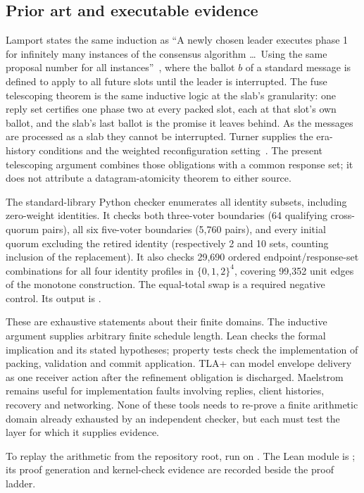 \subsection{Prior art and executable evidence}
Lamport states the same induction as ``A newly chosen leader executes phase 1 for
infinitely many instances of the consensus algorithm \ldots\ Using the same
proposal number for all instances''~\cite{fuse-paxos}, where the ballot $b$ of a
standard message is defined to apply to all future slots until the leader is
interrupted. The fuse telescoping theorem is the same inductive logic at the
slab's granularity: one reply set certifies one phase two at every packed slot,
each at that slot's own ballot, and the slab's last ballot is the promise it
leaves behind. As the messages are processed as a slab they cannot be interrupted.
Turner supplies the era-history conditions and the weighted reconfiguration
setting~\cite{turner}. The present
telescoping argument combines those obligations with a common response set;
it does not attribute a datagram-atomicity theorem to either source.

The standard-library Python checker
 enumerates all identity
subsets, including zero-weight identities. It checks both three-voter
boundaries (64 qualifying cross-quorum pairs), all six five-voter boundaries
(5,760 pairs), and every initial quorum excluding the retired identity
(respectively 2 and 10 sets, counting inclusion of the replacement).
It also checks 29,690 ordered endpoint/response-set combinations for all four
identity profiles in $\{0,1,2\}^4$, covering 99,352 unit edges of the monotone
construction. The equal-total swap is a required negative control. Its output
is .

These are exhaustive statements about their finite domains. The inductive
argument supplies arbitrary finite schedule length. Lean checks the formal
implication and its stated hypotheses; property tests check the implementation
of packing, validation and commit application. TLA+ can model envelope delivery
as one receiver action after the refinement obligation is discharged.
Maelstrom remains useful for implementation faults involving replies, client
histories, recovery and networking. None of these tools needs to re-prove a
finite arithmetic domain already exhausted by an independent checker, but
each must test the layer for which it supplies evidence.

To replay the arithmetic from the repository root, run  on
.
The Lean module is ; its proof
generation and kernel-check evidence are recorded beside the proof ladder.

